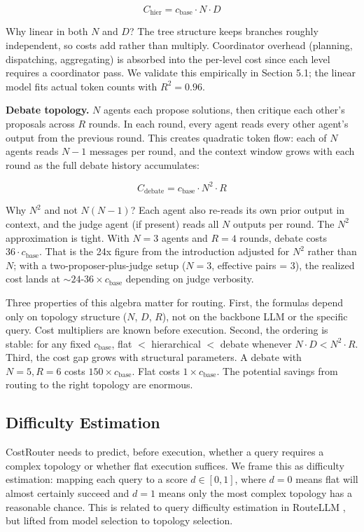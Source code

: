 $$C_{\text{hier}} = c_{\text{base}} \cdot N \cdot D$$

Why linear in both $N$ and $D$? The tree structure keeps branches roughly independent, so costs add rather than multiply. Coordinator overhead (planning, dispatching, aggregating) is absorbed into the per-level cost since each level requires a coordinator pass. We validate this empirically in Section 5.1; the linear model fits actual token counts with $R^2 = 0.96$.

\textbf{Debate topology.} $N$ agents each propose solutions, then critique each other's proposals across $R$ rounds. In each round, every agent reads every other agent's output from the previous round. This creates quadratic token flow: each of $N$ agents reads $N - 1$ messages per round, and the context window grows with each round as the full debate history accumulates:

$$C_{\text{debate}} = c_{\text{base}} \cdot N^2 \cdot R$$

Why $N^2$ and not $N(N-1)$? Each agent also re-reads its own prior output in context, and the judge agent (if present) reads all $N$ outputs per round. The $N^2$ approximation is tight. With $N = 3$ agents and $R = 4$ rounds, debate costs $36 \cdot c_{\text{base}}$. That is the 24x figure from the introduction adjusted for $N^2$ rather than $N$; with a two-proposer-plus-judge setup ($N = 3$, effective pairs = 3), the realized cost lands at $\sim 24$-$36 \times c_{\text{base}}$ depending on judge verbosity.

Three properties of this algebra matter for routing. First, the formulas depend only on topology structure ($N$, $D$, $R$), not on the backbone LLM or the specific query. Cost multipliers are known before execution. Second, the ordering is stable: for any fixed $c_{\text{base}}$, flat $<$ hierarchical $<$ debate whenever $N \cdot D < N^2 \cdot R$. Third, the cost gap grows with structural parameters. A debate with $N = 5, R = 6$ costs $150 \times c_{\text{base}}$. Flat costs $1 \times c_{\text{base}}$. The potential savings from routing to the right topology are enormous.

\subsection{Difficulty Estimation}\label{difficulty-estimation}

CostRouter needs to predict, before execution, whether a query requires a complex topology or whether flat execution suffices. We frame this as difficulty estimation: mapping each query to a score $d \in [0, 1]$, where $d = 0$ means flat will almost certainly succeed and $d = 1$ means only the most complex topology has a reasonable chance. This is related to query difficulty estimation in RouteLLM \cite{ong_2025}, but lifted from model selection to topology selection.

